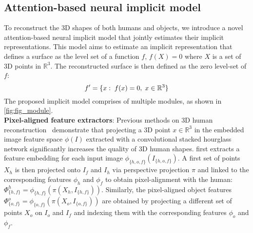 \subsection{Attention-based neural implicit model}
\label{ssec:neural}
To reconstruct the 3D shapes of both humans and objects, we introduce a novel attention-based neural implicit model that jointly estimates their implicit representations. This model aims to estimate an implicit representation that defines a surface as the level set of a function $f$, \ie $f(X) = 0$ where $X$ is a set of 3D points in $\mathbb{R}^3$.  The reconstructed surface is then defined as the zero level-set of $f$:
\vspace{-0.2cm}
\begin{equation}
    f' = \{ x:\; f(x) = 0,\; x\in\mathbb{R}^3\}
\vspace{-0.2cm}
\end{equation}
The proposed implicit model comprises  of multiple modules, as shown in 
\cref{fig:fig_module}.
%
\\\textbf{Pixel-aligned feature extractors}: Previous methods on 3D human reconstruction~\cite{pifu,pifuhd,surs} demonstrate that projecting a 3D point $x \in \mathbb{R}^3$ in the embedded image feature space $\phi(I)$ extracted with a convolutional stacked hourglass network significantly increases the quality of 3D human shapes. \name first extracts a feature embedding for each input image  $\phi_{\{h, o, f\}}(I_{\{h, o, f\}})$. A first set of points $X_h$ is then projected onto $I_f$ and $I_h$ via perspective projection $\pi$ and linked to the corresponding features $\phi_h$ and $\phi_f$ to obtain pixel-alignment with the human: $\Phi_{\{h,f\}}^h=\phi_{\{h,f\}}(\pi(X_h,I_{\{h,f\}}))$. Similarly, the pixel-aligned object features $\Phi_{\{o,f\}}^o=\phi_{\{o,f\}}(\pi(X_o,I_{\{o,f\}}))$ are obtained by projecting a different set of points $X_o$ on $I_o$ and $I_f$ and indexing them with the  corresponding features $\phi_o$ and $\phi_f$.
%
